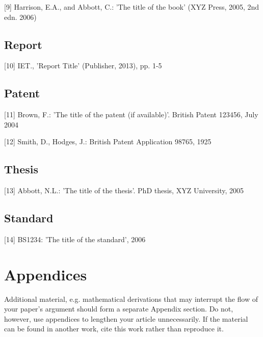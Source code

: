 \documentclass{IET}
\begin{document}
{[9] Harrison, E.A., and Abbott, C.: 'The title of the book' (XYZ Press,
2005, 2nd edn. 2006)

\subsection{Report}

[10] IET., 'Report Title' (Publisher, 2013), pp. 1-5

\subsection{Patent}

[11] Brown, F.: 'The title of the patent (if available)'. British Patent
123456, July 2004

[12] Smith, D., Hodges, J.: British Patent Application 98765, 1925

\subsection{Thesis}

[13] Abbott, N.L.: 'The title of the thesis'. PhD thesis, XYZ University,
2005

\subsection{Standard}

[14] BS1234: 'The title of the standard', 2006}

\section{Appendices}

Additional material, e.g. mathematical derivations that may interrupt the
flow of your paper's argument should form a separate Appendix section. Do
not, however, use appendices to lengthen your article unnecessarily. If the
material can be found in another work, cite this work rather than reproduce it.
\end{document}
